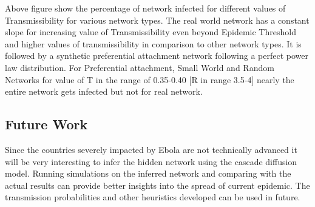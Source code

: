 \documentclass[10pt, journal,onecolumn]{IEEEtran}
\begin{document}
\begin{figure}[ht]
\centering
{}
\end{figure}


Above figure show the percentage of network infected for different values of Transmissibility for  various network types.  The real world network has a constant slope for  increasing value of Transmissibility even beyond Epidemic Threshold and higher values of transmissibility in comparison to other network types.
It is followed by a synthetic preferential attachment network following a perfect power law distribution. For Preferential attachment, Small World and Random Networks for value of T in the range of 0.35-0.40 [R in range 3.5-4] nearly the entire network gets infected but not for real network.

\subsection*{\textbf{Future Work}}

Since the countries  severely impacted by Ebola are not technically  advanced  it will be  very interesting to infer the hidden network using the cascade diffusion model. Running simulations on  the inferred network and comparing  with the actual results can provide better insights into the spread of  current epidemic. The transmission probabilities and other heuristics developed can be used in future.
\end{document}
